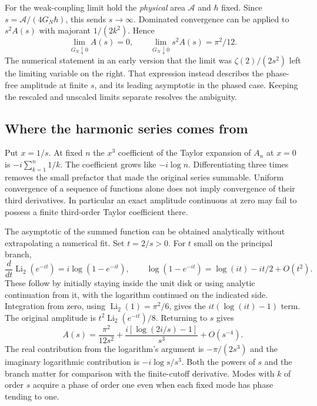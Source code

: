 \documentclass[11pt]{article}
\begin{document}
For the weak-coupling limit hold the \emph{physical} area $\mathcal A$ and $\hbar$ fixed. Since $s=\mathcal A/(4G_N\hbar)$, this sends $s\to\infty$. Dominated convergence can be applied to $s^2A(s)$ with majorant $1/(2k^2)$. Hence
\[
 \lim_{G_N\downarrow0} A(s)=0,\qquad
 \lim_{G_N\downarrow0}s^2 A(s)=\pi^2/12 .
\]
The numerical statement in an early version that the limit was $\zeta(2)/(2s^2)$ left the limiting variable on the right. That expression instead describes the phase-free amplitude at finite $s$, and its leading asymptotic in the phased case. Keeping the rescaled and unscaled limits separate resolves the ambiguity.

\subsection{Where the harmonic series comes from}
Put $x=1/s$. At fixed $n$ the $x^3$ coefficient of the Taylor expansion of $A_n$ at $x=0$ is $-i\sum_{k=1}^n1/k$. The coefficient grows like $-i\log n$. Differentiating three times removes the small prefactor that made the original series summable. Uniform convergence of a sequence of functions alone does not imply convergence of their third derivatives. In particular an exact amplitude continuous at zero may fail to possess a finite third-order Taylor coefficient there.

The asymptotic of the summed function can be obtained analytically without extrapolating a numerical fit. Set $t=2/s>0$. For $t$ small on the principal branch,
\[
 \frac{d}{dt}\operatorname{Li}_2(e^{-it})=i\log(1-e^{-it}),
 \qquad \log(1-e^{-it})=\log(it)-it/2+O(t^2).
\]
These follow by initially staying inside the unit disk or using analytic continuation from it, with the logarithm continued on the indicated side. Integration from zero, using $\operatorname{Li}_2(1)=\pi^2/6$, gives the $it(\log(it)-1)$ term. The original amplitude is $t^2\operatorname{Li}_2(e^{-it})/8$. Returning to $s$ gives
\begin{equation}
 A(s)=\frac{\pi^2}{12s^2}
   +\frac{i[\log(2i/s)-1]}{s^3}+O(s^{-4}).
\end{equation}
The real contribution from the logarithm's argument is $-\pi/(2s^3)$ and the imaginary logarithmic contribution is $-i\log s/s^3$. Both the powers of $s$ and the branch matter for comparison with the finite-cutoff derivative. Modes with $k$ of order $s$ acquire a phase of order one even when each fixed mode has phase tending to one.
\end{document}
